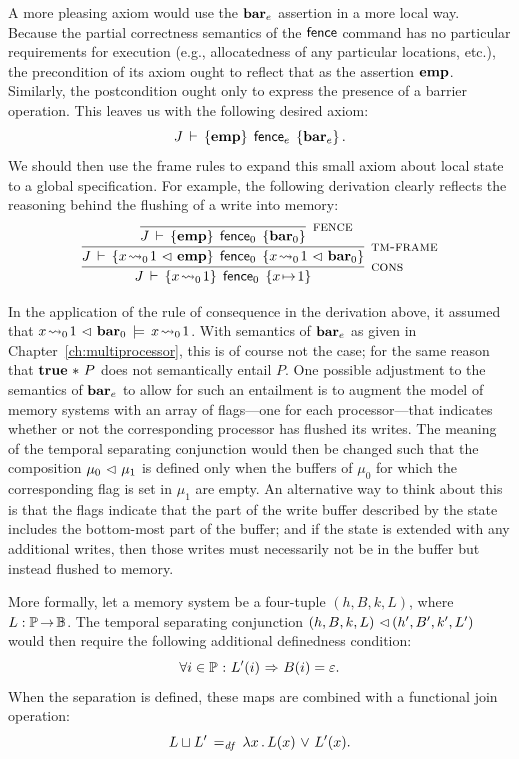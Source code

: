 \documentclass[11pt]{report}
\begin{document}
A more pleasing axiom would use the $\mathbf{bar}_{e}$ assertion in a more local way. Because the partial correctness semantics of the $\operatorname{\mathsf{fence}}$ command has no particular requirements for execution (e.g., allocatedness of any particular locations, etc.), the precondition of its axiom ought to reflect that as the assertion $\mathbf{emp}$. Similarly, the postcondition ought only to express the presence of a barrier operation. This leaves us with the following desired axiom: \[ J\,\vdash\,\left\lbrace \mathbf{emp} \right\rbrace\;\operatorname{\mathsf{fence}}_e\;\left\lbrace \mathbf{bar}_{e} \right\rbrace.\] We should then use the frame rules to expand this small axiom about local state to a global specification. For example, the following derivation clearly reflects the reasoning behind the flushing of a write into memory: \[ \infer[\textsc{cons}]{\spec{J}{x \fwrite{0} 1}{\cfence_0}{x \fpointsto 1}}{\infer[\textsc{tm-frame}]{\spec{J}{x \fwrite{0} 1 \fseq \femp}{\cfence_0}{x \fwrite{0} 1 \fseq \fbar{0}}}{\infer[\textsc{fence}]{\spec{J}{\femp}{\cfence_0}{\fbar{0}}}{}}}\]

In the application of the rule of consequence in the derivation above, it assumed that $x \!\leadsto_{0}\! 1 \operatorname{\,\vartriangleleft\,} \mathbf{bar}_{0} \,\models\, x \!\leadsto_{0}\! 1$. With semantics of $\mathbf{bar}_{e}$ as given in Chapter~\ref{ch:multiprocessor}, this is of course not the case; for the same reason that $\mathbf{true} \operatorname{\,\ast\,} P$ does not semantically entail $P$. One possible adjustment to the semantics of $\mathbf{bar}_{e}$ to allow for such an entailment is to augment the model of memory systems with an array of flags---one for each processor---that indicates whether or not the corresponding processor has flushed its writes. The meaning of the temporal separating conjunction would then be changed such that the composition $\mu_0 \operatorname{\,\vartriangleleft\,} \mu_1$ is defined only when the buffers of $\mu_0$ for which the corresponding flag is set in $\mu_1$ are empty. An alternative way to think about this is that the flags indicate that the part of the write buffer described by the state includes the bottom-most part of the buffer; and if the state is extended with any additional writes, then those writes must necessarily not be in the buffer but instead flushed to memory. 

More formally, let a memory system be a four-tuple $(h,B,k,L)$, where $L : \mathbb{P} \operatorname{\rightarrow} \mathbb{B}$. The temporal separating conjunction $(h,B,k,L) \operatorname{\,\vartriangleleft\,} (h',B',k',L')$ would then require the following additional definedness condition: \[ \forall i \in \mathbb{P} \operatorname{\,:\,} L'(i) \operatorname{\,\Rightarrow\,} B(i) = \varepsilon.\] When the separation is defined, these maps are combined with a functional join operation: \[ L \sqcup L' \operatorname{\;=_{\mathit{df}}\;} \lambda x\,.\, L(x) \operatorname{\,\vee\,} L'(x).\]
\end{document}
